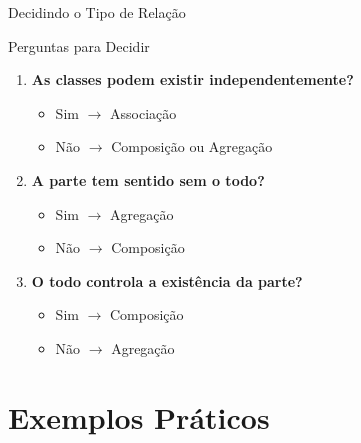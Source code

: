 \documentclass[aspectratio=169]{beamer}
\begin{document}
\begin{frame}{Decidindo o Tipo de Relação}
\begin{block}{Perguntas para Decidir}
\end{block}

\begin{enumerate}
\item \textbf{As classes podem existir independentemente?}
\begin{itemize}
\item Sim $\rightarrow$ Associação
\item Não $\rightarrow$ Composição ou Agregação
\end{itemize}

\vspace{0.3cm}
\item \textbf{A parte tem sentido sem o todo?}
\begin{itemize}
\item Sim $\rightarrow$ Agregação
\item Não $\rightarrow$ Composição
\end{itemize}

\vspace{0.3cm}
\item \textbf{O todo controla a existência da parte?}
\begin{itemize}
\item Sim $\rightarrow$ Composição
\item Não $\rightarrow$ Agregação
\end{itemize}
\end{enumerate}
\end{frame}

\section{Exemplos Práticos}
\end{document}
